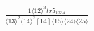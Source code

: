 \documentclass[varwidth, border=5pt]{standalone}
\begin{document}
\begin{my}
$\begin{gathered}
\scriptscriptstyle\frac{1⟨12⟩^3tr5_{1234}}{⟨13⟩^2⟨14⟩^2[14]⟨15⟩⟨24⟩⟨25⟩}
\end{gathered}$
\end{my}
\end{document}
